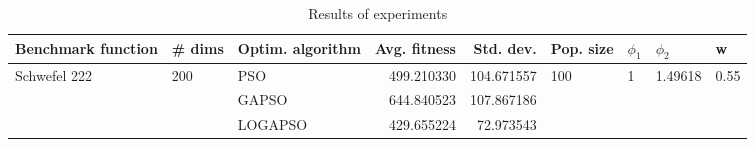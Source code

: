 \begin{table}
\centering
\caption{Results of experiments}
\begin{tabular}{lllrrllll}
\toprule
           Benchmark function &              \# dims & Optim. algorithm &  Avg. fitness &  Std. dev. &            Pop. size &         $\phi_{1}$ &               $\phi_{2}$ &                     w \\
\midrule
\multirow{3}{*}{Schwefel 222} & \multirow{3}{*}{200} &              PSO &    499.210330 & 104.671557 & \multirow{3}{*}{100} & \multirow{3}{*}{1} & \multirow{3}{*}{1.49618} & \multirow{3}{*}{0.55} \\
                              &                      &            GAPSO &    644.840523 & 107.867186 &                      &                    &                          &                       \\
                              &                      &          LOGAPSO &    429.655224 &  72.973543 &                      &                    &                          &                       \\
\bottomrule
\end{tabular}
\end{table}
